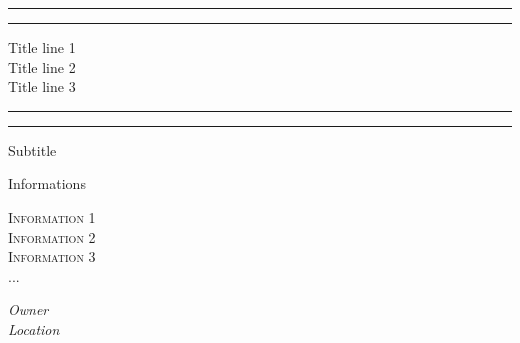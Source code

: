 \documentclass[a4paper, 11pt, oneside]{book} %
\begin{document}
 

\begin{titlepage} 
	\centering 
	\scshape 
	\vspace*{\baselineskip} 
	
	\rule{\textwidth}{1.6pt}\vspace*{-\baselineskip}\vspace*{2pt} 
	\rule{\textwidth}{0.4pt}
	
	\vspace{0.75\baselineskip} 
	
	{\LARGE Title line 1\\ Title line 2\\ Title line 3\\} %
	
	\vspace{0.75\baselineskip} 
	
	\rule{\textwidth}{0.4pt}\vspace*{-\baselineskip}\vspace{3.2pt} 
	\rule{\textwidth}{1.6pt} 
	
	\vspace{2\baselineskip} 
	
	
	Subtitle %
	
	\vspace*{3\baselineskip}
	
	
	Informations
	
	\vspace{0.5\baselineskip} 
	
	{\scshape\Large Information 1 \\ Information 2 \\ Information 3 \\ ... \\}
	
	\vspace{0.8\baselineskip}
	
	\textit{Owner \\ Location \\} 
	
	\vfill %
	
	

\end{titlepage}
\end{document}
